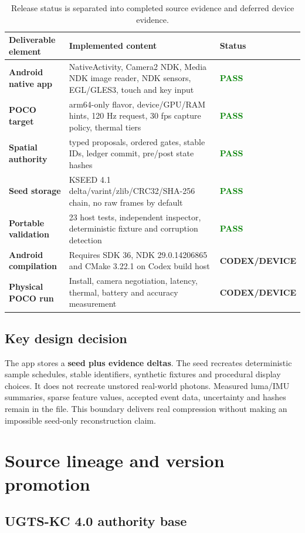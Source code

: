 \documentclass[10.5pt,a4paper]{article}
\newcommand{\pass}{\textcolor{green}{\textbf{PASS}}}
\newcommand{\deferred}{\textcolor{amber}{\textbf{CODEX/DEVICE}}}
\begin{document}
\begin{table}[H]
\centering
\begin{tabularx}{\textwidth}{>{\bfseries}p{38mm} X p{28mm}}
\toprule
Deliverable element & Implemented content & Status\\
\midrule
Android native app & NativeActivity, Camera2 NDK, Media NDK image reader, NDK sensors, EGL/GLES3, touch and key input & \pass\\
POCO target & arm64-only flavor, device/GPU/RAM hints, 120 Hz request, 30 fps capture policy, thermal tiers & \pass\\
Spatial authority & typed proposals, ordered gates, stable IDs, ledger commit, pre/post state hashes & \pass\\
Seed storage & KSEED 4.1 delta/varint/zlib/CRC32/SHA-256 chain, no raw frames by default & \pass\\
Portable validation & 23 host tests, independent inspector, deterministic fixture and corruption detection & \pass\\
Android compilation & Requires SDK 36, NDK 29.0.14206865 and CMake 3.22.1 on Codex build host & \deferred\\
Physical POCO run & Install, camera negotiation, latency, thermal, battery and accuracy measurement & \deferred\\
\bottomrule
\end{tabularx}
\caption{Release status is separated into completed source evidence and deferred device evidence.}
\end{table}

\subsection{Key design decision}

The app stores a \textbf{seed plus evidence deltas}. The seed recreates deterministic sample schedules, stable identifiers, synthetic fixtures and procedural display choices. It does not recreate unstored real-world photons. Measured luma/IMU summaries, sparse feature values, accepted event data, uncertainty and hashes remain in the file. This boundary delivers real compression without making an impossible seed-only reconstruction claim.

\section{Source lineage and version promotion}

\subsection{UGTS-KC 4.0 authority base}
\end{document}
